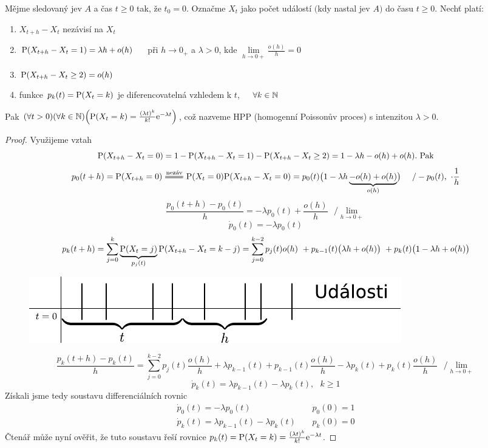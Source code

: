 \begin{theorem}
	Mějme sledovaný jev $A$ a čas $t\geq 0$ tak, že $t_0=0$. Označme $X_t$ jako počet událostí $($kdy nastal jev $A)$ do času $t\geq 0$. Nechť platí:\begin{enumerate}
		\item $X_{t+h} - X_t$ nezávisí na $X_t$
		\item $\mathrm{P}(X_{t+h} - X_t=1)=\lambda h+o(h)$~~~při $h\to 0_+$ a $\lambda>0$, kde $\lim\limits_{ h\to 0+}\frac{o(h)}{h}=0$
		\item $\mathrm{P}(X_{t+h}-X_t \geq 2)=o(h)$
		\item funkce $p_k(t)=\mathrm{P}(X_t=k)$ je diferencovatelná vzhledem k $t$,~~~$\forall k \in \mathbb{N}$
	\end{enumerate}
Pak $(\forall t>0)(\forall k \in \mathbb{N})\Bigl(\mathrm{P}(X_t=k)=\frac{(\lambda t)^k}{k!}\mathrm{e}^{-\lambda t} \Bigr)$, což nazveme HPP (homogenní Poissonův proces) s intenzitou $\lambda>0$.
\begin{proof} Využijeme vztah $$\mathrm{P}(X_{t+h}-X_t=0)=1-\mathrm{P}(X_{t+h}-X_t=1)-\mathrm{P}(X_{t+h}-X_t\geq 2)=1-\lambda h-o(h)+o(h).\text{ Pak}$$
	$$p_0 (t+h)=\PP(X_{t+h}=0)\equal{\text{nezáv}}\PP(X_t=0)\PP(X_{t+h}-X_t=0)=p_0(t)\br{1-\lambda h\underbrace{-o(h)+o(h)}_{o(h)}}~~~~/-p_0(t),~\cdot \frac{1}{h} $$
	$$ \frac{p_0(t+h)-p_0(t)}{h}=-\lambda p_0(t) + \frac{o(h)}{h} ~~~/ \lim\limits_{h\to 0+}$$
	$$ \dot{p}_0(t)=-\lambda p_0(t) $$
	$$
	p_k(t+h)=\sum\limits_{j=0}^k \underbrace{\mathrm{P}(X_t=j)}_{p_j(t)}\mathrm{P}(X_{t+h}-X_t=k-j)= \sum\limits_{j=0}^{k-2}p_j(t)o(h)~+p_{k-1}(t)\bigl(\lambda h +o(h)\bigr)~+p_k(t)\bigl(1-\lambda h+o(h)\bigr) 
	$$
	\begin{figure}[h]
		\centering
		\includegraphics[width=0.6\linewidth]{udalosti}
		\label{fig:udalosti}
	\end{figure}
	$$ \frac{p_k(t+h)-p_k(t)}{h}=\sum\limits_{j=0}^{k-2}p_j(t)\frac{o(h)}{h}+\lambda p_{k-1}(t) + p_{k-1}(t)\frac{o(h)}{h}-\lambda p_k(t) + p_k(t)\frac{o(h)}{h}  ~~~/ \lim\limits_{h\to 0+}$$
	$$	\dot{p}_k(t) =\lambda p_{k-1}(t)-\lambda p_k(t),~~~k\geq 1$$
	Získali jsme tedy soustavu differenciálních rovnic
	\[ \begin{array}{ll}
	\dot{p}_0(t)=-\lambda p_0(t) & p_0(0)=1 \\
	\dot{p}_k(t) =\lambda p_{k-1}(t)-\lambda p_k(t)~~~~~ & p_k(0)=0
	\end{array} \]
	Čtenář může nyní ověřit, že tuto soustavu řeší rovnice $ p_k(t)=\mathrm{P}(X_t=k)=\frac{(\lambda t)^k}{k!}\mathrm{e}^{-\lambda t} $.
\end{proof}
\end{theorem}
